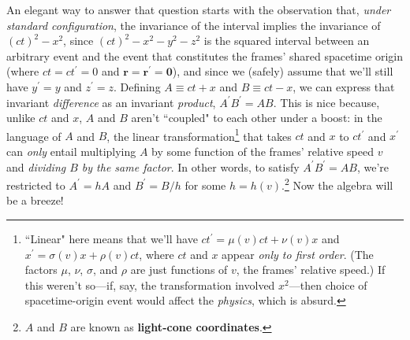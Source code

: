 \documentclass[12pt]{article}
\renewcommand{\vv}[1]{\mathbf{#1}}
\begin{document}
An elegant way to answer that question starts with the observation that, \emph{under standard configuration}, the invariance of the interval implies the invariance of $(ct)^2 - x^2$, since $(ct)^2 - x^2 - y^2 - z^2$ is the squared interval between an arbitrary event and the event that constitutes the frames' shared spacetime origin (where $ct = ct^{\prime} = 0$ and $\vv r = \vv r ^{\prime} = \vv 0$), and since we (safely) assume that we'll still have $y^{\prime} = y$ and $z^{\prime} = z$. Defining $A \equiv ct + x$ and $B \equiv ct - x$, we can express that invariant \emph{difference} as an invariant \emph{product}, $A^{\prime} B^{\prime} = AB$. This is nice because, unlike $ct$ and $x$, $A$ and $B$ aren't ``coupled" to each other under a boost: in the language of $A$ and $B$, the linear transformation\footnote{``Linear" here means that we'll have $ct^{\prime} = \mu(v) ct + \nu(v) x$ and $x^{\prime} = \sigma(v) x + \rho(v) ct$, where $ct$ and $x$ appear \emph{only to first order}. (The factors $\mu$, $\nu$, $\sigma$, and $\rho$ are just functions of $v$, the frames' relative speed.) If this weren't so---if, say, the transformation involved $x^2$---then choice of spacetime-origin event would affect the \emph{physics}, which is absurd.} that takes $ct$ and $x$ to $ct^{\prime}$ and $x^{\prime}$ can \emph{only} entail multiplying $A$ by some function of the frames' relative speed $v$ and \emph{dividing $B$ by the same factor}. In other words, to satisfy $A^{\prime} B^{\prime} = AB$, we're restricted to ${A^{\prime} = hA}$ and ${B^{\prime} = B/h}$ for some $h = h(v)$.\footnote{$A$ and $B$ are known as \textbf{light-cone coordinates}.} Now the algebra will be a breeze!
\end{document}
